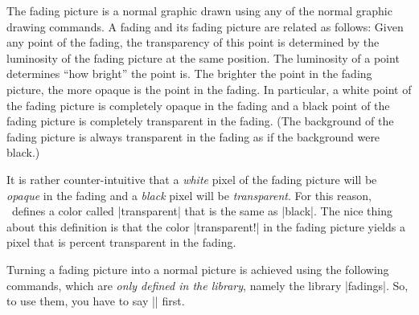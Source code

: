 The fading picture is a normal graphic drawn using any of the normal
graphic drawing commands. A fading and its fading picture are related
as follows: Given any point of the fading, the transparency of this
point is determined by the luminosity of the fading picture at the
same position. The luminosity of a point determines ``how bright'' the
point is. The brighter the point in the fading picture, the more
opaque is the point in the fading. In particular, a white point of the
fading picture is completely opaque in the fading and a black point of
the fading picture is completely transparent in the fading. (The
background of the fading picture is always transparent in the fading
as if the background were black.)

It is rather counter-intuitive that a \emph{white} pixel of the fading
picture will be \emph{opaque} in the fading and a \emph{black} pixel
will be \emph{transparent}. For this reason, \tikzname\ defines a
color called |transparent| that is the same as |black|. The nice thing
about this definition is that the color
|transparent!| in the fading picture yields a
pixel that is  percent transparent in the fading.

Turning a fading picture into a normal picture is achieved using the
following commands, which are \emph{only defined in the library},
namely the library |fadings|. So, to use them, you have to say
|\usetikzlibrary{fadings}| first.

